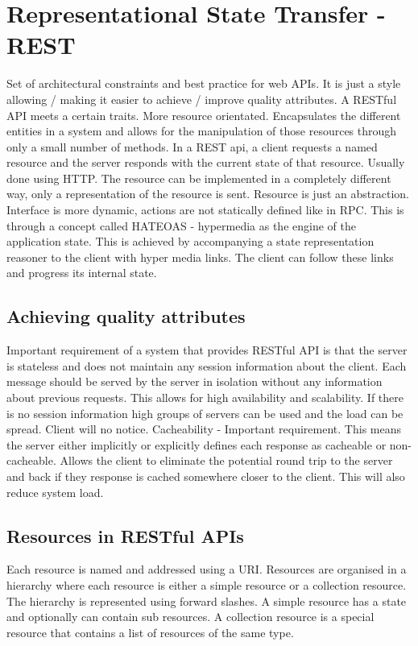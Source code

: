 \documentclass[a4paper, 11pt]{book}
\begin{document}
    \section{Representational State Transfer - REST}
    Set of architectural constraints and best practice for web APIs. It is just a style allowing / making it easier to achieve / improve quality attributes.
    A RESTful API meets a certain traits.
    More resource orientated.
    Encapsulates the different entities in a system and allows for the manipulation of those resources through only a small number of methods.
    In a REST api, a client requests a named resource and the server responds with the current state of that resource.
    Usually done using HTTP. The resource can be implemented in a completely different way, only a representation of the resource is sent.
    Resource is just an abstraction.
    Interface is more dynamic, actions are not statically defined like in RPC.
    This is through a concept called HATEOAS - hypermedia as the engine of the application state.
    This is achieved by accompanying a state representation reasoner to the client with hyper media links.
    The client can follow these links and progress its internal state.

    \subsection{Achieving quality attributes}
    Important requirement of a system that provides RESTful API is that the server is stateless and does not maintain any session information about the client.
    Each message should be served by the server in isolation without any information about previous requests.
    This allows for high availability and scalability.
    If there is no session information high groups of servers can be used and the load can be spread. Client will no notice.
    Cacheability - Important requirement.
    This means the server either implicitly or explicitly defines each response as cacheable or non-cacheable.
    Allows the client to eliminate the potential round trip to the server and back if they response is cached somewhere closer to the client.
    This will also reduce system load.

    \subsection{Resources in RESTful APIs}
    Each resource is named and addressed using a URI.
    Resources are organised in a hierarchy where each resource is either a simple resource or a collection resource.
    The hierarchy is represented using forward slashes.
    A simple resource has a state and optionally can contain sub resources.
    A collection resource is a special resource that contains a list of resources of the same type.
\end{document}
